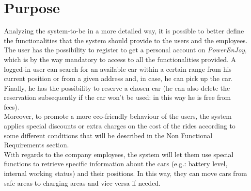 \documentclass[11pt,a4paper]{report}
\begin{document}
\section{Purpose}
Analyzing the system-to-be in a more detailed way, it is possible to better define the functionalities that the system should provide to the users and the employees.\\
The user has the possibility to register to get a personal account on \textit{PowerEnJoy}, which is by the way mandatory to access to all the functionalities provided. A logged-in user can search for an available car within a certain range from his current position or from a given address and, in case, he can pick up the car. Finally, he has the possibility to reserve a chosen car (he can also delete the reservation subsequently if the car won't be used: in this way he is free from fees).\\
Moreover, to promote a more eco-friendly behaviour of the users, the system applies special discounts or extra charges on the cost of the rides according to some different conditions that will be described in the Non Functional Requirements section.\\ 
With regards to the company employees, the system will let them use special functions to retrieve specific information about the cars (e.g.: battery level, internal working status) and their positions. In this way, they can move cars from safe areas to charging areas and vice versa if needed.
\end{document}
